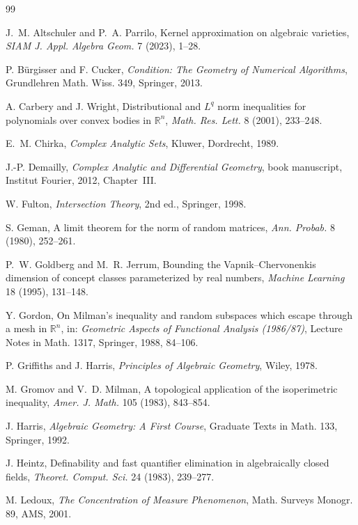 \documentclass[11pt]{article}
\theoremstyle{definition}
\numberwithin{equation}{section}
\newcommand{\R}{\mathbb{R}}
\begin{document}
\begin{thebibliography}{99}

J.~M. Altschuler and P.~A. Parrilo, Kernel approximation on algebraic varieties, \emph{SIAM J. Appl. Algebra Geom.} 7 (2023), 1--28.

P. B\"urgisser and F. Cucker, \emph{Condition: The Geometry of Numerical Algorithms}, Grundlehren Math. Wiss. 349, Springer, 2013.

A. Carbery and J. Wright, Distributional and $L^q$ norm inequalities for polynomials over convex bodies in $\R^n$, \emph{Math. Res. Lett.} 8 (2001), 233--248.

E.~M. Chirka, \emph{Complex Analytic Sets}, Kluwer, Dordrecht, 1989.

J.-P. Demailly, \emph{Complex Analytic and Differential Geometry}, book manuscript, Institut Fourier, 2012, Chapter~III.

W. Fulton, \emph{Intersection Theory}, 2nd ed., Springer, 1998.

S. Geman, A limit theorem for the norm of random matrices, \emph{Ann. Probab.} 8 (1980), 252--261.

P.~W. Goldberg and M.~R. Jerrum, Bounding the Vapnik--Chervonenkis dimension of concept classes parameterized by real numbers, \emph{Machine Learning} 18 (1995), 131--148.

Y. Gordon, On Milman's inequality and random subspaces which escape through a mesh in $\R^n$, in: \emph{Geometric Aspects of Functional Analysis (1986/87)}, Lecture Notes in Math. 1317, Springer, 1988, 84--106.

P. Griffiths and J. Harris, \emph{Principles of Algebraic Geometry}, Wiley, 1978.

M. Gromov and V.~D. Milman, A topological application of the isoperimetric inequality, \emph{Amer. J. Math.} 105 (1983), 843--854.

J. Harris, \emph{Algebraic Geometry: A First Course}, Graduate Texts in Math. 133, Springer, 1992.

J. Heintz, Definability and fast quantifier elimination in algebraically closed fields, \emph{Theoret. Comput. Sci.} 24 (1983), 239--277.

M. Ledoux, \emph{The Concentration of Measure Phenomenon}, Math. Surveys Monogr. 89, AMS, 2001.


\end{thebibliography}
\end{document}
